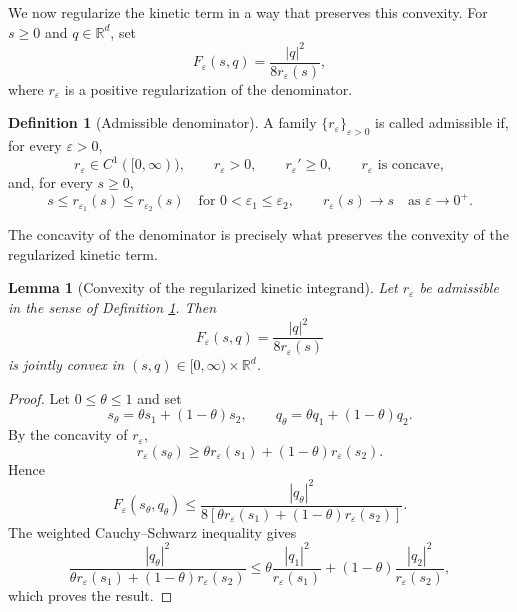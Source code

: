 \documentclass[11pt]{article}
\newcommand{\R}{\mathbb{R}}
\newcommand{\eps}{\varepsilon}
\theoremstyle{plain}
\newtheorem{lemma}[theorem]{Lemma}
\theoremstyle{definition}
\newtheorem{definition}[theorem]{Definition}
\numberwithin{equation}{section}
\begin{document}
We now regularize the kinetic term in a way that preserves this
convexity. For $s\ge0$ and $q\in\R^d$, set
\begin{equation}
\label{eq:regularized-kinetic-integrand}
F_\eps(s,q)
=
\frac{|q|^2}{8r_\eps(s)},
\end{equation}
where $r_\eps$ is a positive regularization of the denominator.

\begin{definition}[Admissible denominator]
\label{def:admissible-regularization}
A family $\{r_\eps\}_{\eps>0}$ is called admissible if, for every
$\eps>0$,
\begin{equation}
\label{eq:regularization-admissibility-local}
r_\eps\in C^1([0,\infty)),
\qquad
r_\eps>0,
\qquad
r_\eps'\ge0,
\qquad
r_\eps \text{ is concave},
\end{equation}
and, for every $s\ge0$,
\begin{equation}
\label{eq:regularization-admissibility-limit}
s
\le
r_{\eps_1}(s)
\le
r_{\eps_2}(s)
\quad
\text{for }0<\eps_1\le\eps_2,
\qquad
r_\eps(s)\to s
\quad\text{as }\eps\to0^+.
\end{equation}
\end{definition}

The concavity of the denominator is precisely what preserves the
convexity of the regularized kinetic term.

\begin{lemma}[Convexity of the regularized kinetic integrand]
\label{lem:regularized-kinetic-convexity}
Let $r_\eps$ be admissible in the sense of Definition \ref{def:admissible-regularization}. Then
\[
F_\eps(s,q)
=
\frac{|q|^2}{8r_\eps(s)}
\]
is jointly convex in $(s,q)\in[0,\infty)\times\R^d$.
\end{lemma}

\begin{proof}
Let $0\le\theta\le1$ and set
\[
s_\theta=\theta s_1+(1-\theta)s_2,
\qquad
q_\theta=\theta q_1+(1-\theta)q_2.
\]
By the concavity of $r_\eps$,
\[
r_\eps(s_\theta)
\ge
\theta r_\eps(s_1)+(1-\theta)r_\eps(s_2).
\]
Hence
\[
F_\eps(s_\theta,q_\theta)
\le
\frac{|q_\theta|^2}
{8[\theta r_\eps(s_1)+(1-\theta)r_\eps(s_2)]}.
\]
The weighted Cauchy--Schwarz inequality gives
\[
\frac{|q_\theta|^2}
{\theta r_\eps(s_1)+(1-\theta)r_\eps(s_2)}
\le
\theta\frac{|q_1|^2}{r_\eps(s_1)}
+
(1-\theta)\frac{|q_2|^2}{r_\eps(s_2)},
\]
which proves the result.
\end{proof} 
\end{document}

